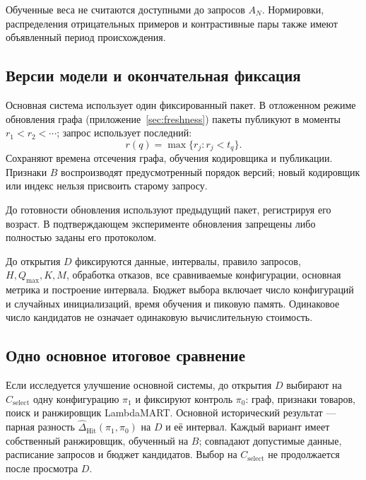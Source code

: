 \documentclass[12pt,a4paper]{article}
\theoremstyle{plainru}
\begin{document}
Обученные веса не считаются доступными до запросов $A_N$.
Нормировки, распределения отрицательных примеров и контрастивные пары
также имеют объявленный период происхождения.

\subsection{Версии модели и окончательная фиксация}
\label{sec:eval-snapshots}

Основная система использует один фиксированный пакет. В отложенном
режиме обновления графа (приложение~\ref{sec:freshness}) пакеты
публикуют в моменты $r_1<r_2<\cdots$; запрос использует последний:
\begin{equation}\label{eq:eval-snapshot}
r(q)=\max\{r_j:r_j<t_q\}.
\end{equation}
Сохраняют времена отсечения графа, обучения кодировщика и публикации.
Признаки $B$ воспроизводят предусмотренный порядок версий;
новый кодировщик или индекс нельзя присвоить старому запросу.

До готовности обновления используют предыдущий пакет, регистрируя
его возраст. В подтверждающем эксперименте обновления запрещены
либо полностью заданы его протоколом.

До открытия $D$ фиксируются данные, интервалы, правило запросов,
$H,Q_{\max},K,M$, обработка отказов, все сравниваемые конфигурации,
основная метрика и построение интервала. Бюджет выбора включает
число конфигураций и случайных инициализаций, время обучения
и пиковую память. Одинаковое число кандидатов не означает
одинаковую вычислительную стоимость.

\subsection{Одно основное итоговое сравнение}
\label{sec:eval-primary-comparison}

Если исследуется улучшение основной системы, до открытия $D$
выбирают на $C_{\mathrm{select}}$ одну конфигурацию $\pi_1$ и фиксируют
контроль $\pi_0$: граф, признаки товаров, поиск и ранжировщик LambdaMART.
Основной исторический результат --- парная разность
$\widehat\Delta_{\mathrm{Hit}}(\pi_1,\pi_0)$ на $D$ и её интервал.
Каждый вариант имеет собственный ранжировщик, обученный на $B$;
совпадают допустимые данные, расписание запросов и бюджет кандидатов.
Выбор на $C_{\mathrm{select}}$ не продолжается после просмотра $D$.
\end{document}
